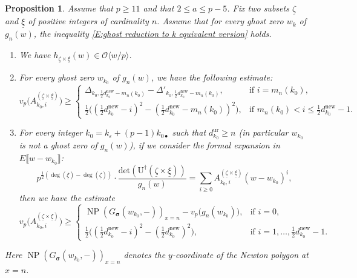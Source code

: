 \documentclass[12pt]{amsart}
\newtheorem{proposition}[subsection]{Proposition}
\theoremstyle{definition}
\numberwithin{equation}{subsection}
\def\calO{\mathcal{O}}
\def\rmU{\mathrm{U}}
\DeclareMathOperator{\NP}{NP}
\newcommand{\bbsigma}{\boldsymbol{\sigma}}
\newcommand{\new}{\mathrm{new}}
\renewcommand{\det}{\mathrm{det}}
\newcommand{\ur}{\mathrm{ur}}
\begin{document}
\begin{proposition}
\label{P:estimate of overcoefficients}
Assume that $p \geq 11$ and that $2 \leq a\leq p-5$.
Fix two subsets $\underline \zeta$ and $\underline \xi$ of positive integers of cardinality $n$. Assume that for every ghost zero $w_k$ of $g_n(w)$, the inequality \eqref{E:ghost reduction to k equivalent version} holds.  
\begin{enumerate}
\item We have $h_{\underline \zeta \times \underline \xi}(w) \in \calO\langle w/p\rangle $.
\item For every ghost zero $w_{k_0}$ of $g_n(w)$, we have the following estimate:
\begin{equation}
\label{E:vp Ak0i}
v_p\big( A_{k_0,i}^{(\underline \zeta \times \underline \xi)}\big) \geq
\begin{cases}
\Delta_{k_0, \frac 12 d_{k_0}^\new - m_n(k_0)} - \Delta'_{k_0, \frac 12 d_{k_0}^\new - m_n(k_0)}, &\text{if~} i=m_n(k_0),\\
\tfrac 12\big((\tfrac 12d_{k_0}^\new-i)^2-(\tfrac 12d_{k_0}^\new-m_n(k_0))^2\big), &\text{if~} m_n(k_0)<i\leq \frac 12d_{k_0}^\new-1.
\end{cases} 
\end{equation}
\item For every integer $k_0 =  k_\varepsilon + (p-1)k_{0\bullet}$ such that $d_{k_0}^\ur\geq n$ (in particular $w_{k_0}$ is not a ghost zero of $g_n(w)$), if we consider the formal expansion in $E\llbracket w-w_{k_0}\rrbracket$:
\begin{equation}
\label{E:formal expansion of det U xi /g_n(w) at a non ghost zero}
p^{\frac 12(\deg(\underline \xi)-\deg(\underline \zeta))}\cdot\frac{\det(\rmU^\dagger(\underline \zeta\times \underline \xi))}{g_n(w)}=\sum_{i\geq 0}A_{k_0,i}^{(\underline \zeta\times \underline \xi)}(w-w_{k_0})^i,
\end{equation}
then we have the estimate
\begin{equation}
\label{E:vp Ak0i for a non ghost zero k_0}
v_p\big( A_{k_0,i}^{(\underline \zeta \times \underline \xi)}\big) \geq
\begin{cases}
\NP(G_{\bbsigma}(w_{k_0},-))_{x=n} - v_p\big(g_n(w_{k_0}) \big), &\text{if~} i=0,\\
\tfrac 12\big((\tfrac 12d_{k_0}^\new-i)^2-(\tfrac 12d_{k_0}^\new)^2\big), &\text{if~}i = 1, \dots, \frac 12d_{k_0}^\new-1.
\end{cases} 
\end{equation}
\end{enumerate}
Here $\NP(G_{\bbsigma}(w_{k_0},-))_{x=n}$ denotes the $y$-coordinate of the Newton polygon at $x=n$.
\end{proposition}
\end{document}
